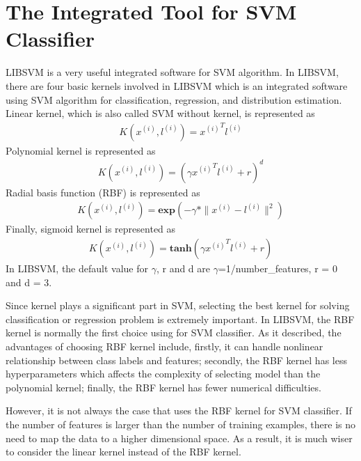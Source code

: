 \section{The Integrated Tool for SVM Classifier}
LIBSVM is a very useful integrated software for SVM algorithm\cite{Chang}. In LIBSVM, there are four basic kernels involved in LIBSVM which is an integrated software using SVM algorithm for classification, regression, and distribution estimation. Linear kernel, which is also called SVM without kernel, is represented as 
\begin{align*}
K(x^{(i)}, l^{(i)}) = {x^{(i)}}^Tl^{(i)}
\end{align*}
Polynomial kernel is represented as 
\begin{align*}
K(x^{(i)}, l^{(i)}) = (\gamma{x^{(i)}}^Tl^{(i)} + r)^d
\end{align*}
Radial basis function (RBF) is represented as 
\begin{align*}
K(x^{(i)}, l^{(i)}) = \textbf{exp}(-\gamma*\|x^{(i)} - l^{(i)}\|^2)
\end{align*}
Finally, sigmoid kernel is represented as 
\begin{align*}
K(x^{(i)}, l^{(i)}) = \textbf{tanh}(\gamma{x^{(i)}}^Tl^{(i)} + r)
\end{align*}
In LIBSVM, the default value for $\gamma$, r and d are $\gamma$=1/number\_features, r = 0 and d = 3. 
\par
Since kernel plays a significant part in SVM, selecting the best kernel for solving classification or regression problem is extremely important. In LIBSVM, the RBF kernel is normally the first choice using for SVM classifier. As it described, the advantages of choosing RBF kernel include, firstly, it can handle nonlinear relationship between class labels and features; secondly, the RBF kernel has less hyperparameters which affects the complexity of selecting model than the polynomial kernel; finally, the RBF kernel has fewer numerical difficulties.
\par
However, it is not always the case that uses the RBF kernel for SVM classifier. If the number of features is larger than the number of training examples, there is no need to map the data to a higher dimensional space. As a result, it is much wiser to consider the linear kernel instead of the RBF kernel. \par

